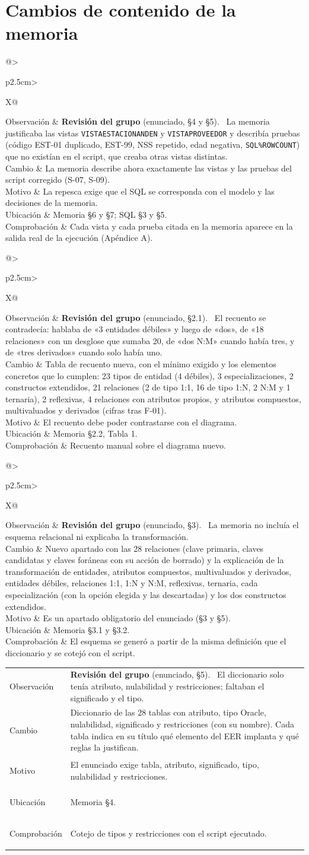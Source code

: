\documentclass[11pt,a4paper]{article}
\makeatletter
\DeclareRobustCommand{\_}{\textunderscore\allowbreak}
\newcommand{\tb}[1]{\texttt{#1}}
\newcommand{\REV}[1]{\textbf{Revisión del grupo} (enunciado, #1).~}
\newcommand{\cambio}[7]{%
\begin{tcolorbox}[colback=white,colframe=azuluvigo,colbacktitle=azuluvigo!8,coltitle=azuluvigo,
  title={\textbf{#1}\quad #2},fonttitle=\normalsize,boxrule=0.6pt,arc=1mm,
  left=2mm,right=2mm,top=1mm,bottom=1mm,before skip=6pt,after skip=6pt]
\small
\begin{tabularx}{\linewidth}{@{}>{\bfseries\raggedright\arraybackslash}p{2.5cm}>{\raggedright\arraybackslash}X@{}}
Observación & #3\\
Cambio & #4\\
Motivo & #5\\
Ubicación & #6\\
Comprobación & #7\\
\end{tabularx}
\end{tcolorbox}}
\makeatother
\begin{document}
\section{Cambios de contenido de la memoria}
\cambio{M-01}{Memoria y script coherentes}
{\REV{§4 y §5} La memoria justificaba las vistas \tb{VISTA\_ESTACION\_ANDEN} y \tb{VISTA\_PROVEEDOR} y describía pruebas (código EST-01 duplicado, EST-99, NSS repetido, edad negativa, \tb{SQL\%ROWCOUNT}) que no existían en el script, que creaba otras vistas distintas.}
{La memoria describe ahora exactamente las vistas y las pruebas del script corregido (S-07, S-09).}
{La repesca exige que el SQL se corresponda con el modelo y las decisiones de la memoria.}
{Memoria §6 y §7; SQL §3 y §5.}
{Cada vista y cada prueba citada en la memoria aparece en la salida real de la ejecución (Apéndice A).}

\cambio{M-02}{Recuento de mínimos}
{\REV{§2.1} El recuento se contradecía: hablaba de «3 entidades débiles» y luego de «dos», de «18 relaciones» con un desglose que sumaba 20, de «dos N:M» cuando había tres, y de «tres derivados» cuando solo había uno.}
{Tabla de recuento nueva, con el mínimo exigido y los elementos concretos que lo cumplen: 23 tipos de entidad (4 débiles), 3 especializaciones, 2 constructos extendidos, 21 relaciones (2 de tipo 1:1, 16 de tipo 1:N, 2 N:M y 1 ternaria), 2 reflexivas, 4 relaciones con atributos propios, y atributos compuestos, multivaluados y derivados (cifras tras F-01).}
{El recuento debe poder contrastarse con el diagrama.}
{Memoria §2.2, Tabla 1.}
{Recuento manual sobre el diagrama nuevo.}

\cambio{M-03}{Modelo relacional y transformación}
{\REV{§3} La memoria no incluía el esquema relacional ni explicaba la transformación.}
{Nuevo apartado con las 28 relaciones (clave primaria, claves candidatas y claves foráneas con su acción de borrado) y la explicación de la transformación de entidades, atributos compuestos, multivaluados y derivados, entidades débiles, relaciones 1:1, 1:N y N:M, reflexivas, ternaria, cada especialización (con la opción elegida y las descartadas) y los dos constructos extendidos.}
{Es un apartado obligatorio del enunciado (§3 y §5).}
{Memoria §3.1 y §3.2.}
{El esquema se generó a partir de la misma definición que el diccionario y se cotejó con el script.}

\cambio{M-04}{Diccionario de datos completo}
{\REV{§5} El diccionario solo tenía atributo, nulabilidad y restricciones; faltaban el significado y el tipo.}
{Diccionario de las 28 tablas con atributo, tipo Oracle, nulabilidad, significado y restricciones (con su nombre). Cada tabla indica en su título qué elemento del EER implanta y qué reglas la justifican.}
{El enunciado exige tabla, atributo, significado, tipo, nulabilidad y restricciones.}
{Memoria §4.}
{Cotejo de tipos y restricciones con el script ejecutado.}
\end{document}
